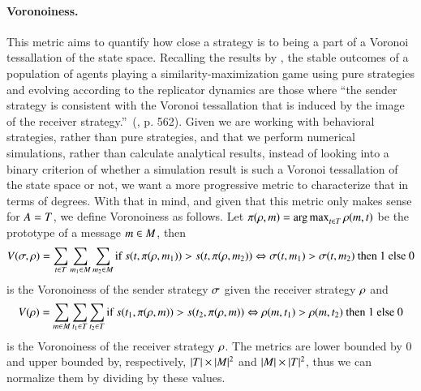 \paragraph{Voronoiness.}
This metric aims to quantify how close a strategy is to being a part of a Voronoi tessallation of the state space.
Recalling the results by \cite{Jager2007}, the stable outcomes of a population of agents playing a similarity-maximization game using pure strategies and evolving according to the replicator dynamics are those where ``the sender strategy is consistent with the Voronoi tessallation that is induced by the image of the receiver strategy.''~(\cite{Jager2007}, p. 562).
Given we are working with behavioral strategies, rather than pure strategies, and that we perform numerical simulations, rather than calculate analytical results, instead of looking into a binary criterion of whether a simulation result is such a Voronoi tessallation of the state space or not, we want a more progressive metric to characterize that in terms of degrees.
With that in mind, and given that this metric only makes sense for $A = T$, we define Voronoiness as follows.
Let $\pi(\rho, m) = \operatorname*{arg\,max}_{t \in T}\rho(m,t)$ be the prototype of a message $m \in M$, then
\begin{multline*}
  V(\sigma, \rho) = \sum_{t \in T} \sum_{m_1 \in M} \sum_{m_2 \in M} \textrm{if } s(t, \pi(\rho, m_1)) > s(t, \pi(\rho, m_2)) \Leftrightarrow \sigma(t, m_1) > \sigma(t, m_2) \textrm{ then } 1 \textrm{ else } 0
\end{multline*}
is the Voronoiness of the sender strategy $\sigma$ given the receiver strategy $\rho$ and
\begin{align*}
  V(\rho) = \sum_{m \in M} \sum_{t_1 \in T} \sum_{t_2 \in T} \textrm{if } s(t_1, \pi(\rho, m)) > s(t_2, \pi(\rho, m)) \Leftrightarrow \rho(m, t_1) > \rho(m, t_2) \textrm{ then } 1 \textrm{ else } 0
\end{align*}
is the Voronoiness of the receiver strategy $\rho$.
The metrics are lower bounded by $0$ and upper bounded by, respectively, $|T| \times |M|^2$ and $|M| \times |T|^2$, thus we can normalize them by dividing by these values.

